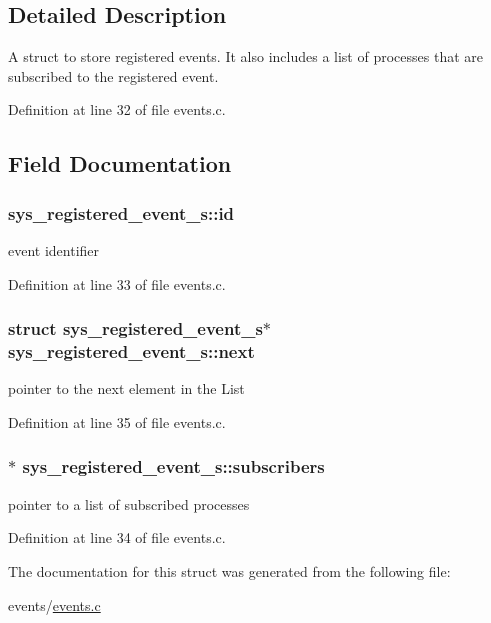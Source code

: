 \subsection{Detailed Description}
A struct to store registered events. It also includes a list of processes that are subscribed to the registered event. 

Definition at line 32 of file events.\+c.



\subsection{Field Documentation}
\hypertarget{structsys__registered__event__s_a44886c67a44aee553cbbbcd9903fcd39}{}
\subsubsection[{id}]{ sys\+\_\+registered\+\_\+event\+\_\+s\+::id}\label{structsys__registered__event__s_a44886c67a44aee553cbbbcd9903fcd39}
event identifier 

Definition at line 33 of file events.\+c.

\hypertarget{structsys__registered__event__s_a084bfc795b0f5135b6439a28bf9920c1}{}
\subsubsection[{next}]{\setlength{\rightskip}{0pt plus 5cm}struct {\bf sys\+\_\+registered\+\_\+event\+\_\+s}$\ast$ sys\+\_\+registered\+\_\+event\+\_\+s\+::next}\label{structsys__registered__event__s_a084bfc795b0f5135b6439a28bf9920c1}
pointer to the next element in the List 

Definition at line 35 of file events.\+c.

\hypertarget{structsys__registered__event__s_acea93fade98b2e5bd81cc9b6ed35388d}{}
\subsubsection[{subscribers}]{$\ast$ sys\+\_\+registered\+\_\+event\+\_\+s\+::subscribers}\label{structsys__registered__event__s_acea93fade98b2e5bd81cc9b6ed35388d}
pointer to a list of subscribed processes 

Definition at line 34 of file events.\+c.



The documentation for this struct was generated from the following file\+:\begin{DoxyCompactItemize}
\item 
events/\hyperlink{events_8c}{events.\+c}\end{DoxyCompactItemize}
